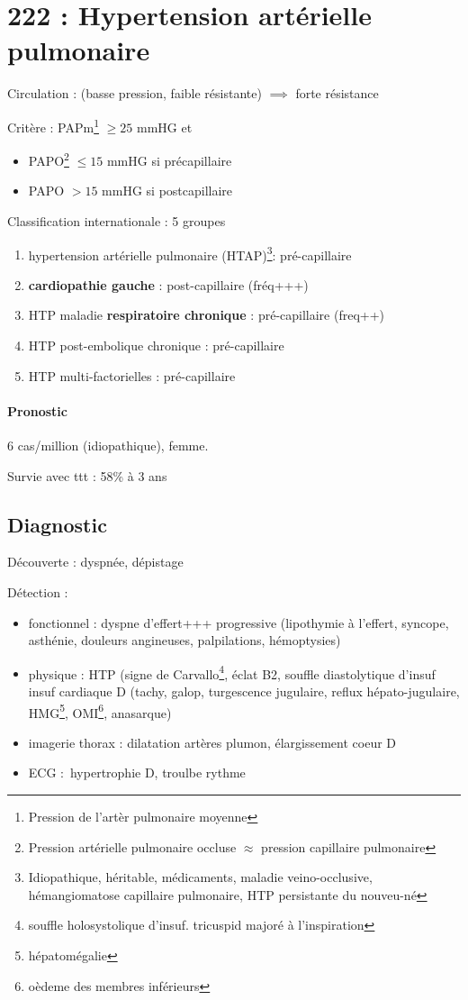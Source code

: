 \section{222 : Hypertension artérielle pulmonaire}%
\label{sec:hypertension_arterielle_pulmonaire}

Circulation : (basse pression, faible résistante) $\implies$ forte résistance

Critère : PAPm\footnote{Pression de l'artèr pulmonaire moyenne} $\ge 25$ mmHG et 
\begin{itemize}
  \item PAPO\footnote{Pression artérielle pulmonaire occluse $\approx$ pression
    capillaire pulmonaire} $\le 15$ mmHG si précapillaire
  \item PAPO $> 15$ mmHG si postcapillaire 
\end{itemize}

Classification internationale : 5 groupes
\begin{enumerate}
  \item hypertension artérielle pulmonaire (HTAP)\footnote{Idiopathique,
      héritable, médicaments, maladie veino-occlusive, hémangiomatose capillaire
    pulmonaire, HTP persistante du nouveu-né}: pré-capillaire
  \item \textbf{cardiopathie gauche}  : post-capillaire (fréq+++)
  \item HTP maladie \textbf{respiratoire chronique}  : pré-capillaire (freq++)
  \item HTP post-embolique chronique : pré-capillaire
  \item HTP multi-factorielles : pré-capillaire
\end{enumerate}

\paragraph{Pronostic}
6 cas/million (idiopathique), femme.

Survie avec ttt : 58\% à 3 ans

\subsection{Diagnostic}
Découverte : dyspnée, dépistage

Détection :
\begin{itemize}
  \item fonctionnel : dyspne d'effert+++ progressive (lipothymie à l'effert,
    syncope, asthénie, douleurs angineuses, palpilations, hémoptysies)
  \item physique : 
    HTP (signe de Carvallo\footnote{souffle holosystolique
    d'insuf. tricuspid majoré à l'inspiration}, éclat B2, souffle diastolytique
    d'insuf\\
    insuf cardiaque D (tachy, galop, turgescence jugulaire, reflux
    hépato-jugulaire, HMG\footnote{hépatomégalie}, OMI\footnote{oèdeme des
    membres inférieurs}, anasarque)
  \item imagerie thorax : dilatation artères plumon, élargissement coeur D
  \item ECG : hypertrophie D, troulbe rythme
\end{itemize}

